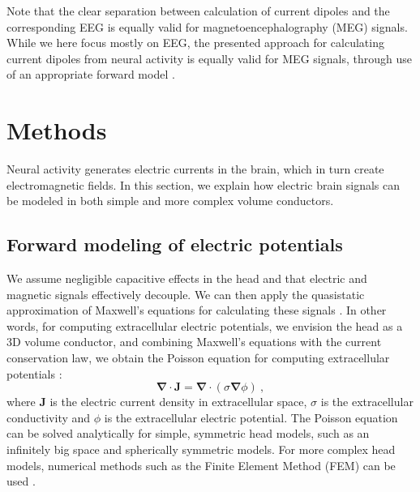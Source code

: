 \documentclass[preprint,10pt,authoryear]{elsarticle}
\begin{document}
Note that the clear separation between calculation of current dipoles and the corresponding EEG is equally valid for magnetoencephalography (MEG) signals. While we here focus mostly on EEG, the presented approach for calculating current dipoles from neural activity is equally valid for MEG signals, through use of an appropriate forward model \citep{HAGEN2018, Ilmoniemi2019}.

\section{Methods}\label{sec:methods}
Neural activity generates electric currents in the brain, which in turn create electromagnetic fields. In this section, we explain how electric brain signals can be modeled in both simple and more complex volume conductors.

\subsection{Forward modeling of electric potentials}
We assume negligible capacitive effects in the head \citep{Pfurtscheller1975, Ranta2017, Miceli2017} and that electric and magnetic signals effectively decouple. We can then apply the quasistatic approximation of Maxwell's equations for calculating these signals \citep{HAMALAINEN1993, NUNEZ2006}. In other words, for computing extracellular electric potentials, we envision the head as a 3D volume conductor, and combining Maxwell's equations with the current conservation law, we obtain the Poisson equation for computing extracellular potentials \citep{GRIFFITHS1999}:
\begin{equation} \label{eq:poisson}
\mathbf{\nabla} \cdot \mathbf{J} = \mathbf{\nabla}  \cdot (\sigma \mathbf{\nabla} \phi)~,
\end{equation}
where $\mathbf{J}$ is the electric current density in extracellular space, $\sigma$ is the extracellular conductivity and $\phi$ is the extracellular electric potential.
The Poisson equation can be solved analytically for simple, symmetric head models, such as an infinitely big space and spherically symmetric models. For more complex head models, numerical methods such as the Finite Element Method (FEM) can be used \citep{LOGG2012, VORWERK2014, Haufe2015, Seo2016, Vorwerk2019}.
\end{document}
